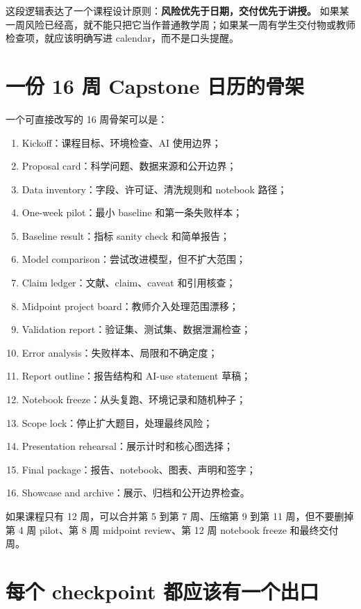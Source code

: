 这段逻辑表达了一个课程设计原则：\textbf{风险优先于日期，交付优先于讲授。} 如果某一周风险已经高，就不能只把它当作普通教学周；如果某一周有学生交付物或教师检查项，就应该明确写进 calendar，而不是口头提醒。

\section{一份 16 周 Capstone 日历的骨架}

一个可直接改写的 16 周骨架可以是：

\begin{enumerate}
    \item Kickoff：课程目标、环境检查、AI 使用边界；
    \item Proposal card：科学问题、数据来源和公开边界；
    \item Data inventory：字段、许可证、清洗规则和 notebook 路径；
    \item One-week pilot：最小 baseline 和第一条失败样本；
    \item Baseline result：指标 sanity check 和简单报告；
    \item Model comparison：尝试改进模型，但不扩大范围；
    \item Claim ledger：文献、claim、caveat 和引用核查；
    \item Midpoint project board：教师介入处理范围漂移；
    \item Validation report：验证集、测试集、数据泄漏检查；
    \item Error analysis：失败样本、局限和不确定度；
    \item Report outline：报告结构和 AI-use statement 草稿；
    \item Notebook freeze：从头复跑、环境记录和随机种子；
    \item Scope lock：停止扩大题目，处理最终风险；
    \item Presentation rehearsal：展示计时和核心图选择；
    \item Final package：报告、notebook、图表、声明和签字；
    \item Showcase and archive：展示、归档和公开边界检查。
\end{enumerate}

如果课程只有 12 周，可以合并第 5 到第 7 周、压缩第 9 到第 11 周，但不要删掉第 4 周 pilot、第 8 周 midpoint review、第 12 周 notebook freeze 和最终交付周。

\section{每个 checkpoint 都应该有一个出口}


